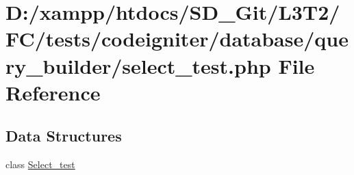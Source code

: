 \hypertarget{select__test_8php}{}\section{D\+:/xampp/htdocs/\+S\+D\+\_\+\+Git/\+L3\+T2/\+F\+C/tests/codeigniter/database/query\+\_\+builder/select\+\_\+test.php File Reference}
\label{select__test_8php}
\subsection*{Data Structures}
\begin{DoxyCompactItemize}
\item 
class \hyperlink{class_select__test}{Select\+\_\+test}
\end{DoxyCompactItemize}
